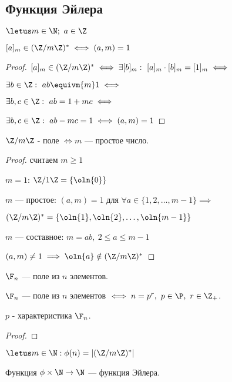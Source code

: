 \subsection{Функция Эйлера}

\begin{theorem-non}
    $\letus m \in \N;~a \in \Z$

    $[a]_m \in (\Z/m\Z)^* \iff (a, m) = 1$
\end{theorem-non}

\begin{proof}
    
    $[a]_m \in (\Z/m\Z)^* \iff \exists [b]_m:~[a]_m \cdot [b]_m = [1]_m \iff$
    
    $\exists b \in \Z:~ab \equivm{m} 1 \iff$
    
    $\exists b, c \in \Z:~ab = 1 + mc \iff$
    
    $\exists b, c \in \Z:~ab - mc = 1 \iff (a, m) = 1$
\end{proof}

\begin{follow}
    $\Z/m\Z$ - поле $\iff m$ --- простое число.
\end{follow}

\begin{proof}
    считаем $m \geq 1$
    
    $m = 1$: $\Z/1\Z = \{\oln{0}\}$
    
    $m$ --- простое: $(a, m) = 1$ для $\forall a \in \{1, 2, \ldots, m-1\} \implies$
    
    $(\Z/m\Z)^* = \{\oln{1}, \oln{2}, \ldots, \oln{m-1}\}$
    
    $m$ --- составное: $m = ab,~2 \leq a \leq m-1$
    
    $(a, m) \neq 1 \implies \oln{a} \notin (\Z/m\Z)^*$
\end{proof}

\begin{defn}
    $\F_{n}$ --- поле из $n$ элементов.
\end{defn}

\begin{theorem-non}
    $\F_{n}$ --- поле из $n$ элементов $\iff n = p^r,~ p \in \P,~ r \in \Z_{+}$.

    $p$ - характеристика $\F_{n}$.
\end{theorem-non}
\begin{proof}
\end{proof}
\begin{defn}
    $\letus m \in \N: \phi(n) = |(\Z/m\Z)^*|$

    Функция $\phi \times \N \to \N$ --- функция Эйлера.
\end{defn}

